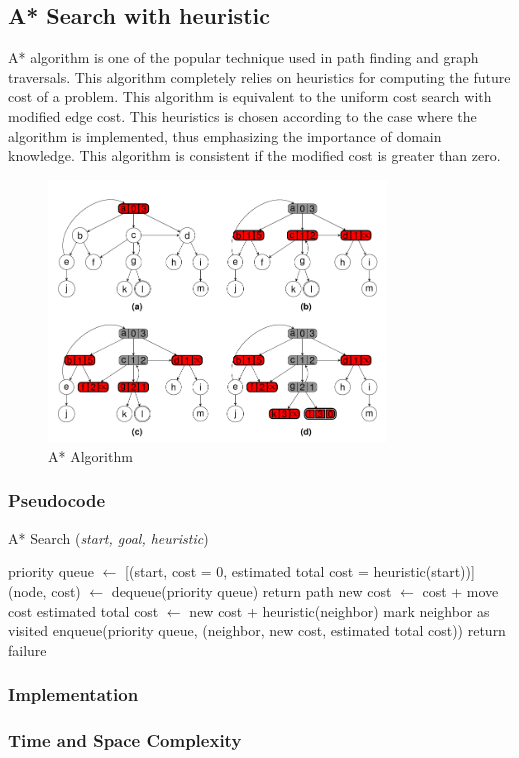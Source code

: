\subsection{A* Search with heuristic}
\noindent A* algorithm is one of the popular technique used in path finding and graph traversals. This algorithm completely relies on heuristics for computing the future cost of a problem. This algorithm is equivalent to the uniform cost search with modified edge cost. This heuristics is chosen according to the case where the algorithm is implemented, thus emphasizing the importance of domain knowledge. This algorithm is consistent if the modified cost is greater than zero.

\begin{figure}[H]
	\centering
	\includegraphics[width=0.8\textwidth]{./imgs/astar.png}
	\caption{A* Algorithm}
\end{figure}

\subsubsection{Pseudocode}
\begin{algorithm}[H]
	\caption{A* Search (\textit{start, goal, heuristic})}
	\label{alg:astar}
	\begin{algorithmic}[1]
	\State priority queue $\gets$ [(start, cost = 0, estimated total cost = heuristic(start))]
		\State (node, cost) $\gets$ dequeue(priority queue)
			\State return path
		\EndIf
			\State new cost $\gets$ cost + move cost
			\State estimated total cost $\gets$ new cost + heuristic(neighbor)
				\State mark neighbor as visited
				\State enqueue(priority queue, (neighbor, new cost, estimated total cost))
			\EndIf
		\EndFor
	\EndWhile
	\State return failure
	\end{algorithmic}
\end{algorithm}

\subsubsection{Implementation}

\subsubsection{Time and Space Complexity}